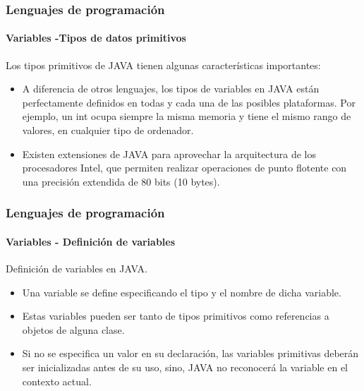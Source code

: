 \documentclass{beamer}
\begin{document}
		\begin{frame}
			\frametitle{Lenguajes de programaci\'on} 
			\framesubtitle{Variables -Tipos de datos primitivos}

			Los tipos primitivos de JAVA tienen algunas caracter\'isticas importantes:

			\begin{itemize}
				\item A diferencia de otros lenguajes, los tipos de variables en JAVA est\'an perfectamente definidos en todas y cada una de las posibles plataformas. Por ejemplo, un int ocupa siempre la misma memoria y tiene el mismo rango de valores, en cualquier tipo de ordenador.
				\item Existen extensiones de JAVA para aprovechar la arquitectura de los procesadores Intel, que permiten realizar operaciones de punto flotente con una precisi\'on extendida de 80 bits (10 bytes).
			\end{itemize}
		\end{frame}

		\begin{frame}
			\frametitle{Lenguajes de programaci\'on} 
			\framesubtitle{Variables - Definici\'on de variables}

			Definici\'on de variables en JAVA.

			\begin{itemize}
				\item Una variable se define especificando el tipo y el nombre de dicha variable.
				\item Estas variables pueden ser tanto de tipos primitivos como referencias a objetos de alguna clase.
				\item Si no se especifica un valor en su declaraci\'on, las variables primitivas deber\'an ser inicializadas antes de su uso, sino, JAVA no reconocer\'a la variable en el contexto actual.
			\end{itemize}
		\end{frame}
\end{document}
